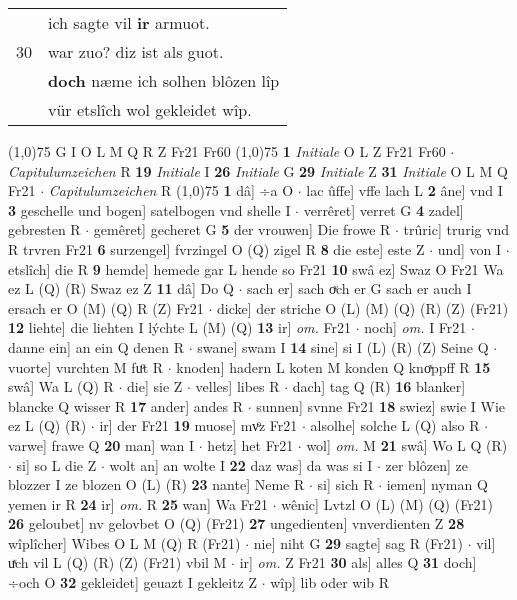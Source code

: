\documentclass[8pt,a4paper,notitlepage]{article}
\begin{document}
\begin{table}[ht]
\begin{minipage}[t]{0.5\linewidth}
\begin{tabular}{rl}
 & ich sagte vil \textbf{ir} armuot.\\ 
30 & war zuo? diz ist als guot.\\ 
 & \textbf{doch} næme ich solhen blôzen lîp\\ 
 & vür etslîch wol gekleidet wîp.\\ 
\end{tabular}
\scriptsize
\line(1,0){75} \newline
G I O L M Q R Z Fr21 Fr60 \newline
\line(1,0){75} \newline
\textbf{1} \textit{Initiale} O L Z Fr21 Fr60   $\cdot$ \textit{Capitulumzeichen} R  \textbf{19} \textit{Initiale} I  \textbf{26} \textit{Initiale} G  \textbf{29} \textit{Initiale} Z  \textbf{31} \textit{Initiale} O L M Q Fr21   $\cdot$ \textit{Capitulumzeichen} R  \newline
\line(1,0){75} \newline
\textbf{1} dâ] ÷a O  $\cdot$ lac ûffe] vffe lach L \textbf{2} âne] vnd I \textbf{3} geschelle und bogen] satelbogen vnd shelle I  $\cdot$ verrêret] verret G \textbf{4} zadel] gebresten R  $\cdot$ gemêret] gecheret G \textbf{5} der vrouwen] Die frowe R  $\cdot$ trûric] trurig vnd R trvren Fr21 \textbf{6} surzengel] fvrzingel O (Q) zigel R \textbf{8} die este] este Z  $\cdot$ und] von I  $\cdot$ etslîch] die R \textbf{9} hemde] hemede gar L hende so Fr21 \textbf{10} swâ ez] Swaz O Fr21 Wa ez L (Q) (R) Swaz ez Z \textbf{11} dâ] Do Q  $\cdot$ sach er] sach oͮch er G sach er auch I ersach er O (M) (Q) R (Z) Fr21  $\cdot$ dicke] der striche O (L) (M) (Q) (R) (Z) (Fr21) \textbf{12} liehte] die liehten I lýchte L (M) (Q) \textbf{13} ir] \textit{om.} Fr21  $\cdot$ noch] \textit{om.} I Fr21  $\cdot$ danne ein] an ein Q denen R  $\cdot$ swane] swam I \textbf{14} sine] si I (L) (R) (Z) Seine Q  $\cdot$ vuorte] vurchten M fuͦt R  $\cdot$ knoden] hadern L koten M konden Q knoͯppff R \textbf{15} swâ] Wa L (Q) R  $\cdot$ die] sie Z  $\cdot$ velles] libes R  $\cdot$ dach] tag Q (R) \textbf{16} blanker] blancke Q wisser R \textbf{17} ander] andes R  $\cdot$ sunnen] svnne Fr21 \textbf{18} swiez] swie I Wie ez L (Q) (R)  $\cdot$ ir] der Fr21 \textbf{19} muose] mvͦz Fr21  $\cdot$ alsolhe] solche L (Q) also R  $\cdot$ varwe] frawe Q \textbf{20} man] wan I  $\cdot$ hetz] het Fr21  $\cdot$ wol] \textit{om.} M \textbf{21} swâ] Wo L Q (R)  $\cdot$ si] so L die Z  $\cdot$ wolt an] an wolte I \textbf{22} daz was] da was si I  $\cdot$ zer blôzen] ze blozzer I ze blozen O (L) (R) \textbf{23} nante] Neme R  $\cdot$ si] sich R  $\cdot$ iemen] nyman Q yemen ir R \textbf{24} ir] \textit{om.} R \textbf{25} wan] Wa Fr21  $\cdot$ wênic] Lvtzl O (L) (M) (Q) (Fr21) \textbf{26} geloubet] nv gelovbet O (Q) (Fr21) \textbf{27} ungedienten] vnverdienten Z \textbf{28} wîplîcher] Wibes O L M (Q) R (Fr21)  $\cdot$ nie] niht G \textbf{29} sagte] sag R (Fr21)  $\cdot$ vil] uͯch vil L (Q) (R) (Z) (Fr21) vbil M  $\cdot$ ir] \textit{om.} Z Fr21 \textbf{30} als] alles Q \textbf{31} doch] ÷och O \textbf{32} gekleidet] geuazt I gekleitz Z  $\cdot$ wîp] lib oder wib R \newline

\end{minipage}
\end{table}
\end{document}
